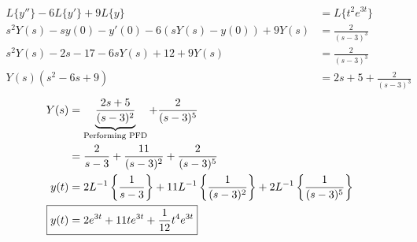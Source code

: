 \documentclass{article}
\begin{document}
\sol
\begin{align*}
  L\{y''\} - 6L\{y'\} + 9L\{y\} &= L\{t^2 e^{3t}\} \\
  s^2 Y(s) - s y(0) - y'(0) - 6(sY(s) - y(0)) + 9Y(s) &= \frac{2}{(s-3)^3} \\
  s^2 Y(s) - 2s - 17 - 6s Y(s) + 12 + 9 Y(s) &= \frac{2}{(s-3)^3} \\
  Y(s)(s^2 - 6s + 9) &= 2s + 5 + \frac{2}{(s-3)^3}
\end{align*}
\begin{align*}
  Y(s) &= \underbrace{\frac{2s+5}{(s-3)^2}}_{\text{Performing PFD}} + \frac{2}{(s-3)^5} \\
  &= \frac{2}{s-3} + \frac{11}{(s-3)^2} + \frac{2}{(s-3)^5} \\
  y(t) &= 2 L^{-1}\left\{\frac{1}{s-3}\right\} + 11 L^{-1}\left\{\frac{1}{(s-3)^2}\right\} + 2 L^{-1}\left\{\frac{1}{(s-3)^5}\right\} \\
  \Aboxed{y(t) &= 2 e^{3t} + 11te^{3t} + \frac{1}{12} t^4 e^{3t}}
\end{align*}
\end{document}
